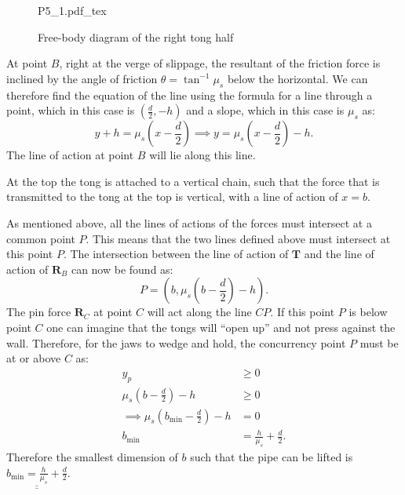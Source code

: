 \documentclass[a4paper]{article}
\newcommand{\incfig}[2][1]{%
  \def\svgwidth{#1\columnwidth}
  {#2.pdf_tex}
}
\theoremstyle{definition}
\begin{document}
\begin{figure}[ht]
  \centering
  \incfig[0.3]{P5_1}
  \caption{Free-body diagram of the right tong half}
  \label{fig:P5-1}
\end{figure}

At point $B$, right at the verge of slippage, the resultant of the friction force is inclined by the angle of friction $\theta = \tan^{-1} \mu_s$ below the horizontal. We can therefore find the equation of the line using the formula for a line through a point, which in this case is $\left( \frac{d}{2}, -h \right)$ and a slope, which in this case is $\mu_s$ as:
\[ 
y + h= \mu_s \left( x - \frac{d}{2} \right) \implies y = \mu _s \left( x - \frac{d}{2} \right) - h
.\]
The line of action at point $B$ will lie along this line.

At the top the tong is attached to a vertical chain, such that the force that is transmitted to the tong at the top is vertical, with a line of action of $x = b$. 

As mentioned above, all the lines of actions of the forces must intersect at a common point $P$. This means that the two lines defined above must intersect at this point $P$. The intersection between the line of action of $\textbf{T}$ and the line of action of $\textbf{R}_B$ can now be found as:
\[ 
P = \left( b, \mu_s \left( b - \frac{d}{2} \right) - h \right)
.\]
The pin force $\textbf{R}_C$ at point $C$ will act along the line $CP$. If this point $P$ is below point $C$ one can imagine that the tongs will ``open up'' and not press against the wall. Therefore, for the jaws to wedge and hold, the concurrency point $P$ must be at or above $C$ as:
\begin{align*}
  y_p &\geq 0 \\
  \mu_s \left( b - \frac{d}{2} \right) - h &\geq 0 \\
  \implies \mu_s \left( b_{\mathrm{min}} - \frac{d}{2} \right) - h &= 0 \\
  b_{\mathrm{min}} &= \frac{h}{\mu_s} + \frac{d}{2}
.\end{align*}
Therefore the smallest dimension of $b$ such that the pipe can be lifted is $ \underline{\underline{b_{\mathrm{min}} = \frac{h}{\mu_s} + \frac{d}{2}}}$.

\newpage
\end{document}
